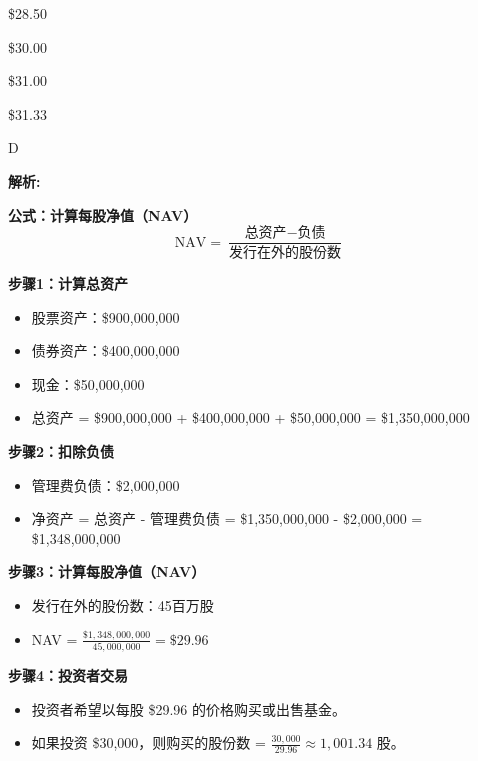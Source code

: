 \documentclass{article}
\newenvironment{explanation}
{\textbf{解析:}\par}
{\par}
\begin{document}
\begin{choices}
    \item \$28.50
    \item \$30.00
    \item \$31.00
    \item \$31.33
\end{choices}

\begin{correctanswer}
    D
\end{correctanswer}

\begin{explanation}

    \textbf{公式：计算每股净值（NAV）}
    \[
    \text{NAV} = \frac{\text{总资产} - \text{负债}}{\text{发行在外的股份数}}
    \]

    \textbf{步骤1：计算总资产}
    \begin{itemize}
        \item 股票资产：\$900,000,000
        \item 债券资产：\$400,000,000
        \item 现金：\$50,000,000
        \item 总资产 = \$900,000,000 + \$400,000,000 + \$50,000,000 = \$1,350,000,000
    \end{itemize}

    \textbf{步骤2：扣除负债}
    \begin{itemize}
        \item 管理费负债：\$2,000,000
        \item 净资产 = 总资产 - 管理费负债 = \$1,350,000,000 - \$2,000,000 = \$1,348,000,000
    \end{itemize}

    \textbf{步骤3：计算每股净值（NAV）}
    \begin{itemize}
        \item 发行在外的股份数：45百万股
        \item NAV = \(\frac{\$1,348,000,000}{45,000,000} = \$29.96\)
    \end{itemize}

    \textbf{步骤4：投资者交易}
    \begin{itemize}
        \item 投资者希望以每股 \$29.96 的价格购买或出售基金。
        \item 如果投资 \$30,000，则购买的股份数 = \(\frac{30,000}{29.96} \approx 1,001.34\) 股。
    \end{itemize}

\end{explanation}
\end{document}
